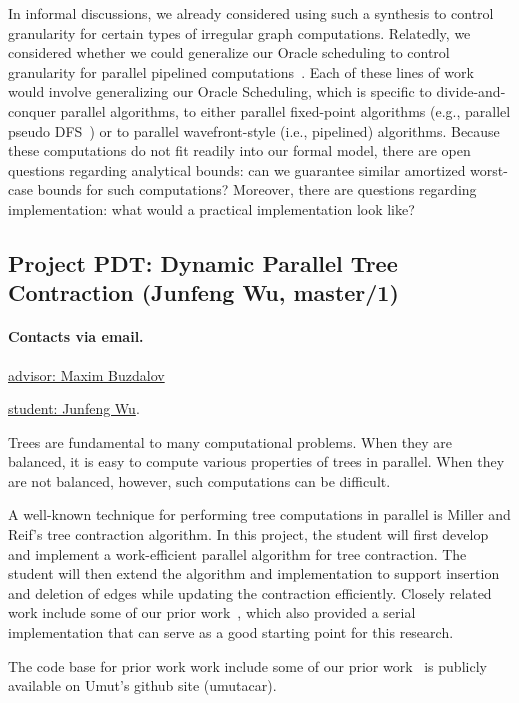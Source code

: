 \documentclass[11pt]{article}
\newcommand{\email}[2]{\href{mailto:#2}{#1}}
\begin{document}
In informal discussions, we already considered using such a synthesis
to control granularity for certain types of irregular graph
computations.  Relatedly, we considered whether we could generalize
our Oracle scheduling to control granularity for parallel pipelined
computations~\cite{lee2013fly}.  Each of these lines of work would
involve generalizing our Oracle Scheduling, which is specific to
divide-and-conquer parallel algorithms, to either parallel fixed-point
algorithms (e.g., parallel pseudo DFS~\cite{CongKoKrLeSa08}) or to
parallel wavefront-style (i.e., pipelined) algorithms.  Because these
computations do not fit readily into our formal model, there are open
questions regarding analytical bounds: can we guarantee similar
amortized worst-case bounds for such computations?  Moreover, there
are questions regarding implementation: what would a practical
implementation look like?

\subsection{Project  PDT: Dynamic Parallel Tree Contraction (Junfeng
  Wu, master/1)}


\paragraph{Contacts via email.}
\email{advisor: Maxim Buzdalov}{mbuzdalov@gmail.com}

\email{student: Junfeng Wu}{fengone7@gmail.com}.

Trees are fundamental to many computational problems. When they are
balanced, it is easy to compute various properties of trees in
parallel.  When they are not balanced, however, such computations can
be difficult.

A well-known technique for performing tree computations in parallel is
Miller and Reif's tree contraction algorithm.  In this project, the
student will first develop and implement a work-efficient parallel
algorithm for tree contraction.  The student will then extend the
algorithm and implementation to support insertion and deletion of
edges while updating the contraction efficiently.  Closely related
work include some of our prior work~\cite{AcarBlHaViWo04,AcarBlVi05},
which also provided a serial implementation that can serve as a good
starting point for this research.

The code base for prior work work include some of our prior
work~\cite{AcarBlHaViWo04,AcarBlVi05} is publicly available on Umut's
github site (umutacar).
\end{document}
